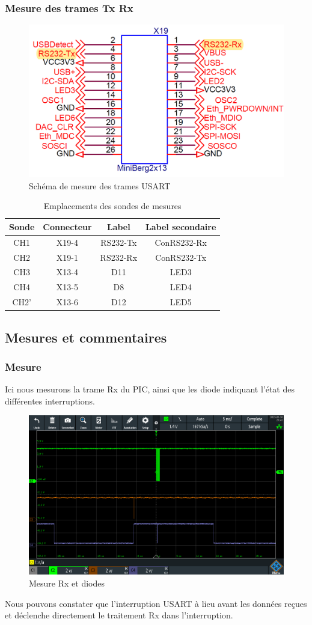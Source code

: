 {{	\subsubsection{Mesure des trames Tx Rx}
	\begin{figure}[h]
		\centering
		\includegraphics[width=0.45\linewidth]{SchemaRxTx}
		\caption{Schéma de mesure des trames USART}
		\label{fig:schemarxtx}
	\end{figure}
		\begin{table}[!h]
	\centering
	\begin{tabular}{c|c|c|c}
		Sonde & Connecteur & Label & Label secondaire \\
		\hline\hline
		CH1 & X19-4 & RS232-Tx & ConRS232-Rx \\
		CH2 & X19-1 & RS232-Rx & ConRS232-Tx \\
		CH3 & X13-4 & D11 & LED3 \\
		CH4 & X13-5 & D8 & LED4 \\
		CH2' & X13-6 & D12 & LED5 \\
	\end{tabular}
		\caption{Emplacements des sondes de mesures}
		\label{tab:tableauSondes2}
	\end{table}
	}
	
	\clearpage
	\subsection{Mesures et commentaires}
	{
		\subsubsection{Mesure}
		
		Ici nous mesurons la trame Rx du PIC, ainsi que les diode indiquant l'état des différentes interruptions.
		
		\centering
		 
		
		\begin{figure}[h]
			\centering
			\includegraphics[width=0.55\linewidth]{MesuresLedsRx}
			\caption{Mesure Rx et diodes}
			\label{fig:mesuresledsrx}
		\end{figure}
		Nous pouvons constater que l'interruption USART à lieu avant les données reçues et déclenche directement le traitement Rx dans l'interruption.
		
}}
